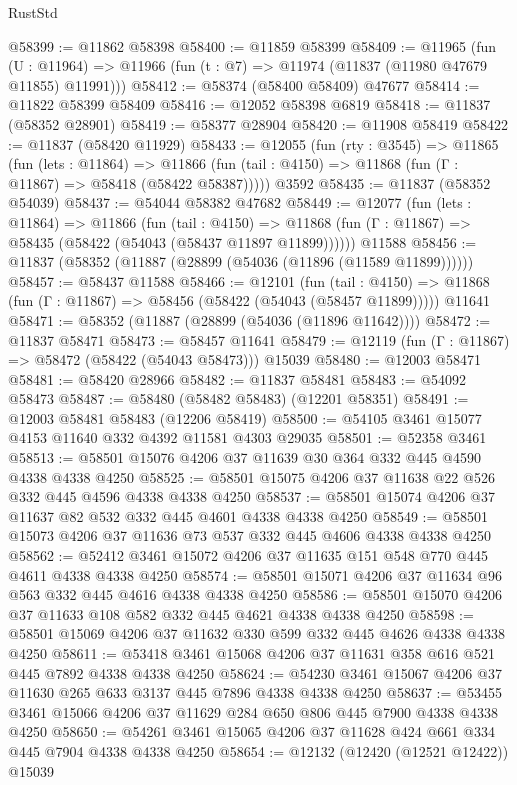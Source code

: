 \begin{lexlean}{RustStd}
\begin{coremodule}
{\begin{coremodule}
{{{{{{{{{{{{{{{{{{{{{{{{{{{{{{{{{{{{{{{{{{{{{{{{{{@58399 := @11862 @58398
@58400 := @11859 @58399
@58409 := @11965
    (fun (U : @11964) => @11966 (fun (t : @7) => @11974 (@11837 (@11980 @47679 @11855) @11991)))
@58412 := @58374 (@58400 @58409) @47677
@58414 := @11822 @58399 @58409
@58416 := @12052 @58398 @6819
@58418 := @11837 (@58352 @28901)
@58419 := @58377 @28904
@58420 := @11908 @58419
@58422 := @11837 (@58420 @11929)
@58433 := @12055
    (fun (rty : @3545) =>
    @11865
      (fun (lets : @11864) =>
      @11866 (fun (tail : @4150) => @11868 (fun (Γ : @11867) => @58418 (@58422 @58387)))))
    @3592
@58435 := @11837 (@58352 @54039)
@58437 := @54044 @58382 @47682
@58449 := @12077
    (fun (lets : @11864) =>
    @11866
      (fun (tail : @4150) =>
      @11868 (fun (Γ : @11867) => @58435 (@58422 (@54043 (@58437 @11897 @11899))))))
    @11588
@58456 := @11837 (@58352 (@11887 (@28899 (@54036 (@11896 (@11589 @11899))))))
@58457 := @58437 @11588
@58466 := @12101
    (fun (tail : @4150) => @11868 (fun (Γ : @11867) => @58456 (@58422 (@54043 (@58457 @11899)))))
    @11641
@58471 := @58352 (@11887 (@28899 (@54036 (@11896 @11642))))
@58472 := @11837 @58471
@58473 := @58457 @11641
@58479 := @12119 (fun (Γ : @11867) => @58472 (@58422 (@54043 @58473))) @15039
@58480 := @12003 @58471
@58481 := @58420 @28966
@58482 := @11837 @58481
@58483 := @54092 @58473
@58487 := @58480 (@58482 @58483) (@12201 @58351)
@58491 := @12003 @58481 @58483 (@12206 @58419)
@58500 := @54105 @3461 @15077 @4153 @11640 @332 @4392 @11581 @4303 @29035
@58501 := @52358 @3461
@58513 := @58501 @15076 @4206 @37 @11639 @30 @364 @332 @445 @4590 @4338 @4338 @4250
@58525 := @58501 @15075 @4206 @37 @11638 @22 @526 @332 @445 @4596 @4338 @4338 @4250
@58537 := @58501 @15074 @4206 @37 @11637 @82 @532 @332 @445 @4601 @4338 @4338 @4250
@58549 := @58501 @15073 @4206 @37 @11636 @73 @537 @332 @445 @4606 @4338 @4338 @4250
@58562 := @52412 @3461 @15072 @4206 @37 @11635 @151 @548 @770 @445 @4611 @4338 @4338 @4250
@58574 := @58501 @15071 @4206 @37 @11634 @96 @563 @332 @445 @4616 @4338 @4338 @4250
@58586 := @58501 @15070 @4206 @37 @11633 @108 @582 @332 @445 @4621 @4338 @4338 @4250
@58598 := @58501 @15069 @4206 @37 @11632 @330 @599 @332 @445 @4626 @4338 @4338 @4250
@58611 := @53418 @3461 @15068 @4206 @37 @11631 @358 @616 @521 @445 @7892 @4338 @4338 @4250
@58624 := @54230 @3461 @15067 @4206 @37 @11630 @265 @633 @3137 @445 @7896 @4338 @4338 @4250
@58637 := @53455 @3461 @15066 @4206 @37 @11629 @284 @650 @806 @445 @7900 @4338 @4338 @4250
@58650 := @54261 @3461 @15065 @4206 @37 @11628 @424 @661 @334 @445 @7904 @4338 @4338 @4250
@58654 := @12132 (@12420 (@12521 @12422)) @15039
}}}}}}}}}}}}}}}}}}}}}}}}}}}}}}}}}}}}}}}}}}}}}}}}}}
\end{coremodule}}
\end{coremodule}
\end{lexlean}
